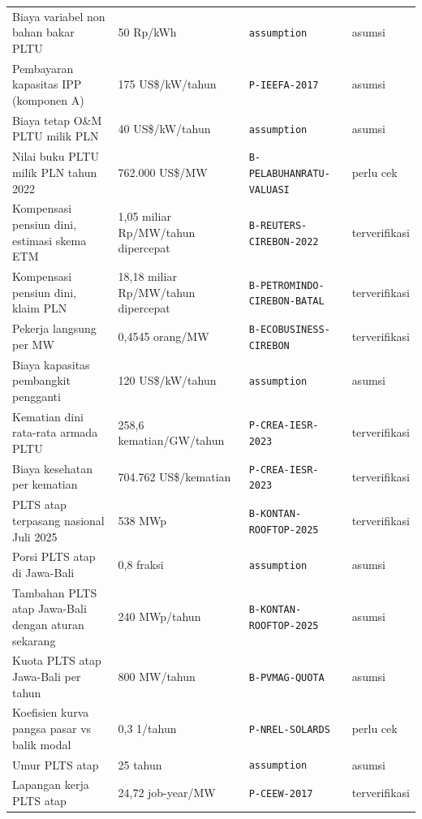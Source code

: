 \begin{longtable}{p{} p{} p{} p{}}
Biaya variabel non bahan bakar PLTU & 50 Rp/kWh & \texttt{assumption} & asumsi \\
Pembayaran kapasitas IPP (komponen A) & 175 US\$/kW/tahun & \texttt{P-\allowbreak{}IEEFA-\allowbreak{}2017} & asumsi \\
Biaya tetap O\&M PLTU milik PLN & 40 US\$/kW/tahun & \texttt{assumption} & asumsi \\
Nilai buku PLTU milik PLN tahun 2022 & 762.000 US\$/MW & \texttt{B-\allowbreak{}PELABUHANRATU-\allowbreak{}VALUASI} & perlu cek \\
Kompensasi pensiun dini, estimasi skema ETM & 1,05 miliar Rp/MW/tahun dipercepat & \texttt{B-\allowbreak{}REUTERS-\allowbreak{}CIREBON-\allowbreak{}2022} & terverifikasi \\
Kompensasi pensiun dini, klaim PLN & 18,18 miliar Rp/MW/tahun dipercepat & \texttt{B-\allowbreak{}PETROMINDO-\allowbreak{}CIREBON-\allowbreak{}BATAL} & terverifikasi \\
Pekerja langsung per MW & 0,4545 orang/MW & \texttt{B-\allowbreak{}ECOBUSINESS-\allowbreak{}CIREBON} & terverifikasi \\
Biaya kapasitas pembangkit pengganti & 120 US\$/kW/tahun & \texttt{assumption} & asumsi \\
Kematian dini rata-rata armada PLTU & 258,6 kematian/GW/tahun & \texttt{P-\allowbreak{}CREA-\allowbreak{}IESR-\allowbreak{}2023} & terverifikasi \\
Biaya kesehatan per kematian & 704.762 US\$/kematian & \texttt{P-\allowbreak{}CREA-\allowbreak{}IESR-\allowbreak{}2023} & terverifikasi \\
PLTS atap terpasang nasional Juli 2025 & 538 MWp & \texttt{B-\allowbreak{}KONTAN-\allowbreak{}ROOFTOP-\allowbreak{}2025} & terverifikasi \\
Porsi PLTS atap di Jawa-Bali & 0,8 fraksi & \texttt{assumption} & asumsi \\
Tambahan PLTS atap Jawa-Bali dengan aturan sekarang & 240 MWp/tahun & \texttt{B-\allowbreak{}KONTAN-\allowbreak{}ROOFTOP-\allowbreak{}2025} & asumsi \\
Kuota PLTS atap Jawa-Bali per tahun & 800 MW/tahun & \texttt{B-\allowbreak{}PVMAG-\allowbreak{}QUOTA} & asumsi \\
Koefisien kurva pangsa pasar vs balik modal & 0,3 1/tahun & \texttt{P-\allowbreak{}NREL-\allowbreak{}SOLARDS} & perlu cek \\
Umur PLTS atap & 25 tahun & \texttt{assumption} & asumsi \\
Lapangan kerja PLTS atap & 24,72 job-year/MW & \texttt{P-\allowbreak{}CEEW-\allowbreak{}2017} & terverifikasi \\

\end{longtable}
